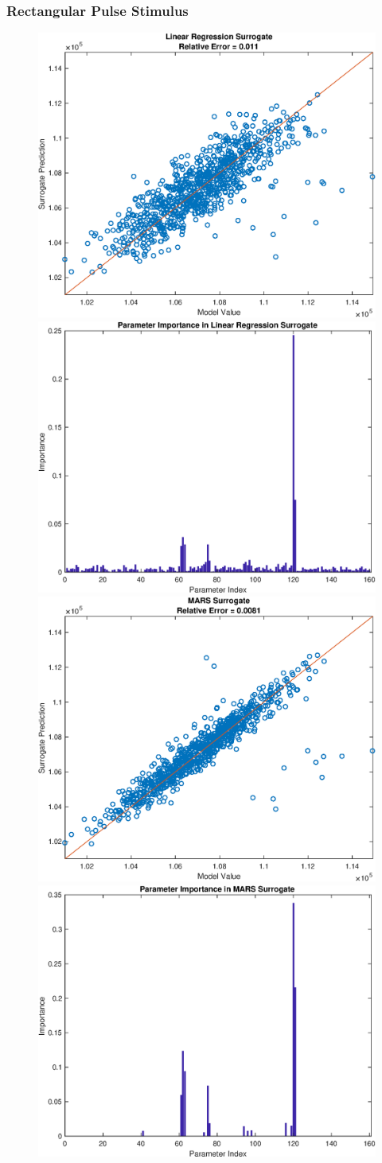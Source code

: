 \documentclass[12pt]{article}
\numberwithin{equation}{section}
\begin{document}
\subsubsection{Rectangular Pulse Stimulus}

\begin{figure}[h]
\centering
\includegraphics[width=.49 \textwidth]{Figures/K_AC_Max_QoI_LR_Prediction_Rectangular.eps}
\includegraphics[width=.49 \textwidth]{Figures/K_AC_Max_QoI_LR_VI_Rectangular.eps}\\
\includegraphics[width=.49 \textwidth]{Figures/K_AC_Max_QoI_MARS_Prediction_Rectangular.eps}
\includegraphics[width=.49 \textwidth]{Figures/K_AC_Max_QoI_MARS_VI_Rectangular.eps}
\end{figure}
\end{document}
